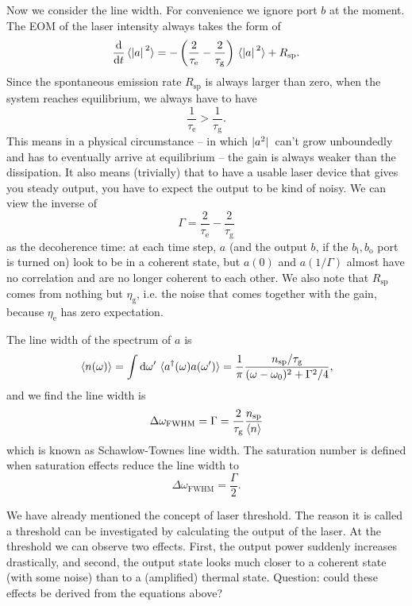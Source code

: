 \documentclass[hyperref, a4paper]{article}
\newcommand*{\bi}{b_{\text{i}}}
\newcommand*{\bo}{b_{\text{o}}}
\newcommand*{\taue}{\tau_{\text{e}}}
\newcommand*{\taug}{\tau_{\text{g}}}
\begin{document}
Now we consider the line width. For convenience we ignore port $b$ at the moment. 
The EOM of the laser intensity always takes the form of
\begin{equation}
    \dv{t} \expval*{\abs*{a}^2} = - \left( \frac{2}{\taue} - \frac{2}{\taug} \right) \expval*{\abs*{a}^2} + R_{\text{sp}}.
\end{equation} 
Since the spontaneous emission rate $R_{\text{sp}}$ is always larger than zero,
when the system reaches equilibrium, we always have to have 
\begin{equation}
    \frac{1}{\taue} > \frac{1}{\taug}.
\end{equation}
This means in a physical circumstance -- in which $\abs*{a^2}$ can't grow unboundedly and has to eventually arrive at equilibrium
-- the gain is always weaker than the dissipation. 
It also means (trivially) that to have a usable laser device that gives you steady output,
you have to expect the output to be kind of noisy. 
We can view the inverse of 
\begin{equation}
    \Gamma = \frac{2}{\taue} - \frac{2}{\taug}
\end{equation}
as the decoherence time: at each time step, $a$ (and the output $b$, if the $\bi, \bo$ port is turned on) 
look to be in a coherent state, 
but $a(0)$ and $a(1/\Gamma)$ almost have no correlation and are no longer coherent to each other.
We also note that $R_{\text{sp}}$ comes from nothing but $\eta_{\text{g}}$,
i.e. the noise that comes together with the gain,
because $\eta_{\text{e}}$ has zero expectation.

The line width of the spectrum of $a$ is 
\begin{equation}
    \expval*{n(\omega)} = \int \dd{\omega'} \expval*{a^\dag(\omega) a(\omega')} = \frac{1}{\pi} \frac{n_{\text{sp}} / \taug}{(\omega - \omega_0)^2 + \Gamma^2 / 4},
\end{equation}
and we find the line width is 
\begin{equation}
    \Delta \omega_{\text{FWHM}} = \Gamma = \frac{2}{\taug} \frac{n_{\text{sp}}}{\expval{n}}
\end{equation}
which is known as Schawlow-Townes line width.
The saturation number is defined when saturation effects reduce the line width to  
\begin{equation}
    \Delta \omega_{\text{FWHM}} = \frac{\Gamma}{2}. 
\end{equation}

We have already mentioned the concept of laser threshold.
The reason it is called a threshold can be investigated by calculating the output of the laser.
At the threshold we can observe two effects.
First, the output power suddenly increases drastically, 
and second, the output state looks much closer to a coherent state (with some noise)
than to a (amplified) thermal state.
Question: could these effects be derived from the equations above?
\end{document}
